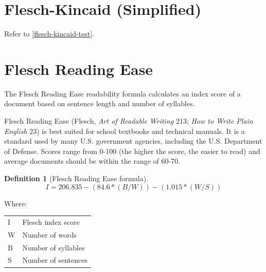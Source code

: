 \documentclass[
]{book}
\theoremstyle{definition}
\newtheorem{definition}{Definition}[chapter]
\theoremstyle{definition}
\theoremstyle{definition}
\theoremstyle{definition}
\theoremstyle{remark}
\begin{document}

\hypertarget{flesch-kincaid-test-simplified}{%
\section{\texorpdfstring{Flesch-Kincaid (Simplified)}{Flesch-Kincaid (Simplified)}}\label{flesch-kincaid-test-simplified}}

Refer to \ref{flesch-kincaid-test}.

\newpage

\hypertarget{flesch-test}{%
\section{\texorpdfstring{Flesch Reading Ease}{Flesch Reading Ease}}\label{flesch-test}}

The Flesch Reading Ease readability formula calculates an index score of a document based on sentence length and number of syllables.

Flesch Reading Ease (Flesch, \emph{Art of Readable Writing} 213; \emph{How to Write Plain English} 23) is best suited for school textbooks and technical manuals. It is a standard used by many U.S. government agencies, including the U.S. Department of Defense. Scores range from 0-100 (the higher the score, the easier to read) and average documents should be within the range of 60-70.

\begin{definition}[Flesch Reading Ease formula]
\protect\hypertarget{def:flesch}{}{\label{def:flesch} {} }\[
I = 206.835 - (84.6*(B/W)) - (1.015*(W/S))
\]
\end{definition}

Where:

\begin{longtable}[]{@{}
  >{\raggedright\arraybackslash}p{}
  >{\raggedright\arraybackslash}p{}@{}}
\toprule
\endhead
I & Flesch index score \\
W & Number of words \\
B & Number of syllables \\
S & Number of sentences \\
\bottomrule
\end{longtable}
\end{document}
